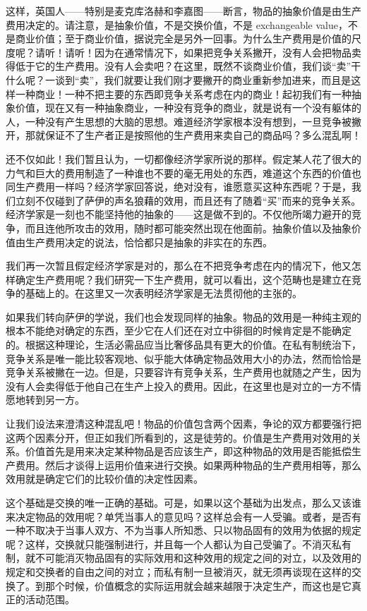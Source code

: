 \documentclass[a4paper,twoside,12pt]{ctexart}
\begin{document}
这样，英国人——特别是麦克库洛赫和李嘉图——断言，物品的抽象价值是由生产费用决定的。请注意，是抽象价值，不是交换价值，不是 exchangeable value，不是商业价值；至于商业价值，据说完全是另外一回事。为什么生产费用是价值的尺度呢？请听！请听！因为在通常情况下，如果把竞争关系撇开，没有人会把物品卖得低于它的生产费用。没有人会卖吧？在这里，既然不谈商业价值，我们谈“卖”干什么呢？一谈到“卖”，我们就要让我们刚才要撇开的商业重新参加进来，而且是这样一种商业！一种不把主要的东西即竞争关系考虑在内的商业！起初我们有一种抽象价值，现在又有一种抽象商业，一种没有竞争的商业，就是说有一个没有躯体的人，一种没有产生思想的大脑的思想。难道经济学家根本没有想到，一旦竞争被撇开，那就保证不了生产者正是按照他的生产费用来卖自己的商品吗？多么混乱啊！

还不仅如此！我们暂且认为，一切都像经济学家所说的那样。假定某人花了很大的力气和巨大的费用制造了一种谁也不要的毫无用处的东西，难道这个东西的价值也同生产费用一样吗？经济学家回答说，绝对没有，谁愿意买这种东西呢？于是，我们立刻不仅碰到了萨伊的声名狼藉的效用，而且还有了随着“买”而来的竞争关系。经济学家是一刻也不能坚持他的抽象的——这是做不到的。不仅他所竭力避开的竞争，而且连他所攻击的效用，随时都可能突然出现在他面前。抽象价值以及抽象价值由生产费用决定的说法，恰恰都只是抽象的非实在的东西。

我们再一次暂且假定经济学家是对的，那么在不把竞争考虑在内的情况下，他又怎样确定生产费用呢？我们研究一下生产费用，就可以看出，这个范畴也是建立在竞争的基础上的。在这里又一次表明经济学家是无法贯彻他的主张的。

如果我们转向萨伊的学说，我们也会发现同样的抽象。物品的效用是一种纯主观的根本不能绝对确定的东西，至少它在人们还在对立中徘徊的时候肯定是不能确定的。根据这种理论，生活必需品应当比奢侈品具有更大的价值。在私有制统治下，竞争关系是唯一能比较客观地、似乎能大体确定物品效用大小的办法，然而恰恰是竞争关系被撇在一边。但是，只要容许有竞争关系，生产费用也就随之产生，因为没有人会卖得低于他自己在生产上投入的费用。因此，在这里也是对立的一方不情愿地转到另一方。

让我们设法来澄清这种混乱吧！物品的价值包含两个因素，争论的双方都要强行把这两个因素分开，但正如我们所看到的，这是徒劳的。价值是生产费用对效用的关系。价值首先是用来决定某种物品是否应该生产，即这种物品的效用是否能抵偿生产费用。然后才谈得上运用价值来进行交换。如果两种物品的生产费用相等，那么效用就是确定它们的比较价值的决定性因素。

这个基础是交换的唯一正确的基础。可是，如果以这个基础为出发点，那么又该谁来决定物品的效用呢？单凭当事人的意见吗？这样总会有一人受骗。或者，是否有一种不取决于当事人双方、不为当事人所知悉、只以物品固有的效用为依据的规定呢？这样，交换就只能强制进行，并且每一个人都认为自己受骗了。不消灭私有制，就不可能消灭物品固有的实际效用和这种效用的规定之间的对立，以及效用的规定和交换者的自由之间的对立；而私有制一旦被消灭，就无须再谈现在这样的交换了。到那个时候，价值概念的实际运用就会越来越限于决定生产，而这也是它真正的活动范围。
\end{document}
